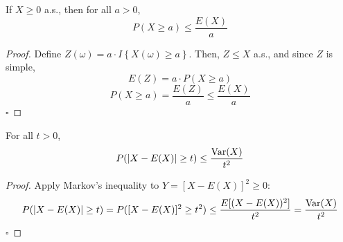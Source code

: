 

\begin{reqproof}
\begin{theorem}
    If $X \geq 0$ a.s., then for all $a>0$,
    \[P(X \geq a) \leq \frac{E(X)}{a}\]
    \begin{proof}
        Define $Z(\omega) = a \cdot I\left\{X(\omega) \geq a\right\}$. Then, $Z\leq X$ a.s., and since $Z$ is simple,
        \[E(Z) = a\cdot P(X\geq a)\]
        \[P(X\geq a) = \frac{E(Z)}{a} \leq \frac{E(X)}{a}\]
        \hfill $\square$
    \end{proof}
\end{theorem}
\end{reqproof}

\begin{reqproof}
\begin{theorem}
    For all $t > 0$,
    \[P(|X- E(X)|\geq t) \leq \frac{\operatorname{Var}(X)}{t^2}\]
    \begin{proof}
        Apply Markov's inequality to $Y = [X-E(X)]^2 \geq 0$:
        \[P(|X-E(X)| \geq t) = P([X-E(X)]^2 \geq t^2) \leq \frac{E[(X-E(X))^2]}{t^2} = \frac{\operatorname{Var}(X)}{t^2}\]
        \hfill $\square$
    \end{proof}
\end{theorem}
\end{reqproof}

